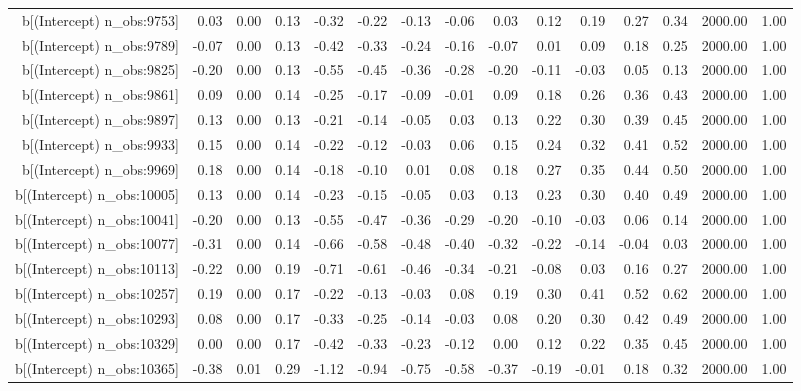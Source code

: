 \begin{table}[ht]
\begin{tabular}{rrrrrrrrrrrrrrr}
  b[(Intercept) n\_obs:9753] & 0.03 & 0.00 & 0.13 & -0.32 & -0.22 & -0.13 & -0.06 & 0.03 & 0.12 & 0.19 & 0.27 & 0.34 & 2000.00 & 1.00 \\ 
  b[(Intercept) n\_obs:9789] & -0.07 & 0.00 & 0.13 & -0.42 & -0.33 & -0.24 & -0.16 & -0.07 & 0.01 & 0.09 & 0.18 & 0.25 & 2000.00 & 1.00 \\ 
  b[(Intercept) n\_obs:9825] & -0.20 & 0.00 & 0.13 & -0.55 & -0.45 & -0.36 & -0.28 & -0.20 & -0.11 & -0.03 & 0.05 & 0.13 & 2000.00 & 1.00 \\ 
  b[(Intercept) n\_obs:9861] & 0.09 & 0.00 & 0.14 & -0.25 & -0.17 & -0.09 & -0.01 & 0.09 & 0.18 & 0.26 & 0.36 & 0.43 & 2000.00 & 1.00 \\ 
  b[(Intercept) n\_obs:9897] & 0.13 & 0.00 & 0.13 & -0.21 & -0.14 & -0.05 & 0.03 & 0.13 & 0.22 & 0.30 & 0.39 & 0.45 & 2000.00 & 1.00 \\ 
  b[(Intercept) n\_obs:9933] & 0.15 & 0.00 & 0.14 & -0.22 & -0.12 & -0.03 & 0.06 & 0.15 & 0.24 & 0.32 & 0.41 & 0.52 & 2000.00 & 1.00 \\ 
  b[(Intercept) n\_obs:9969] & 0.18 & 0.00 & 0.14 & -0.18 & -0.10 & 0.01 & 0.08 & 0.18 & 0.27 & 0.35 & 0.44 & 0.50 & 2000.00 & 1.00 \\ 
  b[(Intercept) n\_obs:10005] & 0.13 & 0.00 & 0.14 & -0.23 & -0.15 & -0.05 & 0.03 & 0.13 & 0.23 & 0.30 & 0.40 & 0.49 & 2000.00 & 1.00 \\ 
  b[(Intercept) n\_obs:10041] & -0.20 & 0.00 & 0.13 & -0.55 & -0.47 & -0.36 & -0.29 & -0.20 & -0.10 & -0.03 & 0.06 & 0.14 & 2000.00 & 1.00 \\ 
  b[(Intercept) n\_obs:10077] & -0.31 & 0.00 & 0.14 & -0.66 & -0.58 & -0.48 & -0.40 & -0.32 & -0.22 & -0.14 & -0.04 & 0.03 & 2000.00 & 1.00 \\ 
  b[(Intercept) n\_obs:10113] & -0.22 & 0.00 & 0.19 & -0.71 & -0.61 & -0.46 & -0.34 & -0.21 & -0.08 & 0.03 & 0.16 & 0.27 & 2000.00 & 1.00 \\ 
  b[(Intercept) n\_obs:10257] & 0.19 & 0.00 & 0.17 & -0.22 & -0.13 & -0.03 & 0.08 & 0.19 & 0.30 & 0.41 & 0.52 & 0.62 & 2000.00 & 1.00 \\ 
  b[(Intercept) n\_obs:10293] & 0.08 & 0.00 & 0.17 & -0.33 & -0.25 & -0.14 & -0.03 & 0.08 & 0.20 & 0.30 & 0.42 & 0.49 & 2000.00 & 1.00 \\ 
  b[(Intercept) n\_obs:10329] & 0.00 & 0.00 & 0.17 & -0.42 & -0.33 & -0.23 & -0.12 & 0.00 & 0.12 & 0.22 & 0.35 & 0.45 & 2000.00 & 1.00 \\ 
  b[(Intercept) n\_obs:10365] & -0.38 & 0.01 & 0.29 & -1.12 & -0.94 & -0.75 & -0.58 & -0.37 & -0.19 & -0.01 & 0.18 & 0.32 & 2000.00 & 1.00 \\ 

\end{tabular}
\end{table}
